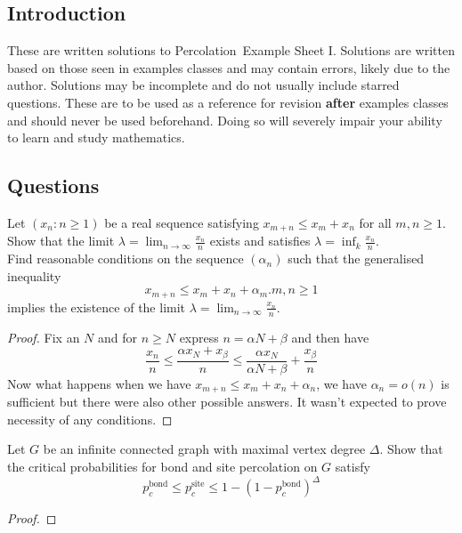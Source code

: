 \documentclass[a4paper]{article}
\def\ntitle{Percolation}
\def\nsheet{I}
\begin{document}
	
	
	\subsection*{Introduction}
	These are written solutions to \ntitle \ Example Sheet \nsheet. Solutions are written based on those seen in examples classes and may contain errors, likely due to the author. Solutions may be incomplete and do not usually include starred questions. These are to be used as a reference for revision \textbf{after} examples classes and should never be used beforehand. Doing so will severely impair your ability to learn and study mathematics.
	\subsection*{Questions}

	\begin{question}[Question 1]
	Let $(x_n : n \geq 1)$ be a real sequence satisfying $x_{m+n} \leq x_m + x_n$ for all $m,n \geq 1$. Show that the limit $\lambda = \lim_{n \to \infty}{\frac{x_n}{n}}$ exists and satisfies $\lambda = \inf_k{\frac{x_n}{n}}$.\\
	Find reasonable conditions on the sequence $(\alpha_n)$ such that the generalised inequality
	\[x_{m+n} \leq x_m + x_n + \alpha_m. m,n \geq 1\]
	implies the existence of the limit $\lambda = \lim_{n \to \infty}{\frac{x_n}{n}}$.
	\end{question}
	\begin{proof}
	Fix an $N$ and for $n \geq N$ express $n = \alpha N + \beta$ and then have
	\[\frac{x_n}{n} \leq \frac{\alpha x_{N} + x_{\beta}}{n} \leq \frac{\alpha x_N}{\alpha N+\beta}+\frac{x_{\beta}}{n}\]
	Now what happens when we have $x_{m+n} \leq x_m + x_n + \alpha_n$, we have $\alpha_n = o(n)$ is sufficient but there were also other possible answers. It wasn't expected to prove necessity of any conditions.
	\end{proof}
	
	\begin{question}[Question 2]
	Let $G$ be an infinite connected graph with maximal vertex degree $\Delta$. Show that the critical probabilities for bond and site percolation on $G$ satisfy
	\[p_c^{\text{bond}} \leq p_c^{\text{site}} \leq 1 - (1 - p_c^{\text{bond}})^{\Delta}\]
	\end{question}
	\begin{proof}
	
	\end{proof}
	
\end{document}
